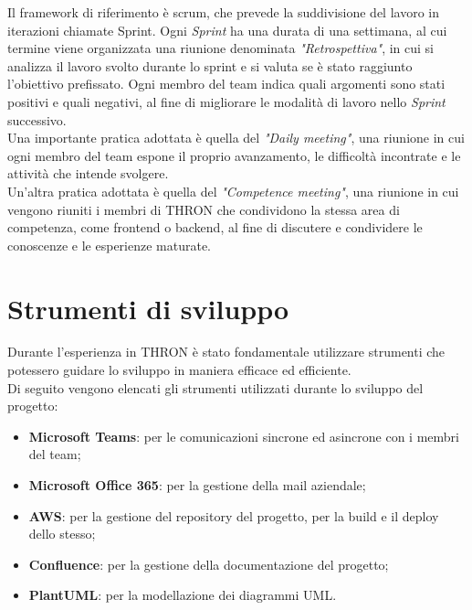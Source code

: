 Il \glsfirstoccur\gls{framework} di riferimento è \glsfirstoccur\gls{scrum}, che prevede la suddivisione del
lavoro in iterazioni chiamate \glsfirstoccur\gls{Sprint}. Ogni \emph{Sprint} ha una durata di una
settimana, al cui termine viene organizzata una riunione denominata
\emph{"Retrospettiva"}, in cui si analizza il lavoro svolto durante lo sprint
e si valuta se è stato raggiunto l'obiettivo prefissato. Ogni
membro del team indica quali argomenti sono stati positivi e quali
negativi, al fine di migliorare le modalità di lavoro nello
\emph{Sprint} successivo.\\
Una importante pratica adottata è quella del \emph{"Daily
      meeting"}, una riunione in cui ogni membro del team espone il proprio
avanzamento, le difficoltà incontrate e le attività che intende svolgere. \\
Un'altra pratica adottata è quella del \emph{"Competence meeting"}, una riunione
in cui vengono riuniti i membri di THRON che condividono la stessa area di
competenza, come \glsfirstoccur\gls{frontend} o \glsfirstoccur\gls{backend}, al
fine di discutere e condividere le conoscenze e le esperienze maturate. \cite{agile-manifesto}\\

\section{Strumenti di sviluppo}
Durante l'esperienza in THRON è stato fondamentale utilizzare strumenti che
potessero guidare lo sviluppo in maniera efficace ed efficiente.\\
Di seguito vengono elencati gli strumenti utilizzati durante lo sviluppo del
progetto:
\begin{itemize}
      \item \textbf{Microsoft Teams}: per le comunicazioni sincrone ed asincrone
            con i membri del team;
      \item \textbf{Microsoft Office 365}: per la gestione della mail aziendale;
      \item \textbf{\glsfirstoccur\gls{AWS}}: per la gestione del \glsfirstoccur\gls{repository} del
            progetto, per la \glsfirstoccur\gls{build} e il \glsfirstoccur\gls{deploy}
            dello stesso;
      \item \textbf{Confluence}: per la gestione della documentazione del progetto;
      \item \textbf{PlantUML}: per la modellazione dei diagrammi \glsfirstoccur\gls{UML}.
\end{itemize}


